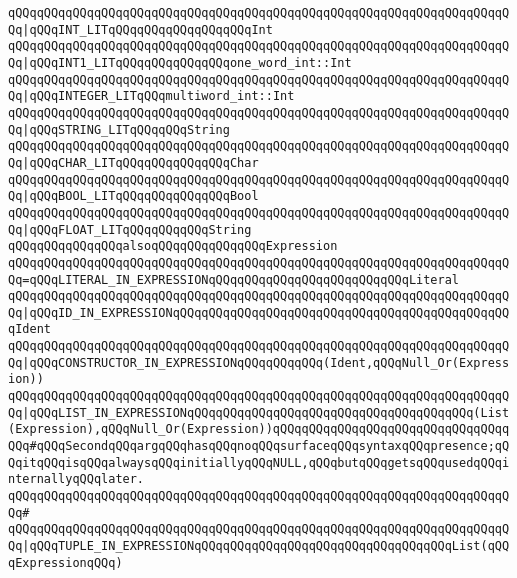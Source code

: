 \verb|qQQqqQQqqQQqqQQqqQQqqQQqqQQqqQQqqQQqqQQqqQQqqQQqqQQqqQQqqQQqqQQqqQQqqQQq|\verb#|qQQqINT_LITqQQqqQQqqQQqqQQqqQQqInt#\newline
\verb|qQQqqQQqqQQqqQQqqQQqqQQqqQQqqQQqqQQqqQQqqQQqqQQqqQQqqQQqqQQqqQQqqQQqqQQq|\verb#|qQQqINT1_LITqQQqqQQqqQQqqQQqone_word_int::Int#\newline
\verb|qQQqqQQqqQQqqQQqqQQqqQQqqQQqqQQqqQQqqQQqqQQqqQQqqQQqqQQqqQQqqQQqqQQqqQQq|\verb#|qQQqINTEGER_LITqQQqmultiword_int::Int#\newline
\verb|qQQqqQQqqQQqqQQqqQQqqQQqqQQqqQQqqQQqqQQqqQQqqQQqqQQqqQQqqQQqqQQqqQQqqQQq|\verb#|qQQqSTRING_LITqQQqqQQqString#\newline
\verb|qQQqqQQqqQQqqQQqqQQqqQQqqQQqqQQqqQQqqQQqqQQqqQQqqQQqqQQqqQQqqQQqqQQqqQQq|\verb#|qQQqCHAR_LITqQQqqQQqqQQqqQQqChar#\newline
\verb|qQQqqQQqqQQqqQQqqQQqqQQqqQQqqQQqqQQqqQQqqQQqqQQqqQQqqQQqqQQqqQQqqQQqqQQq|\verb#|qQQqBOOL_LITqQQqqQQqqQQqqQQqBool#\newline
\verb|qQQqqQQqqQQqqQQqqQQqqQQqqQQqqQQqqQQqqQQqqQQqqQQqqQQqqQQqqQQqqQQqqQQqqQQq|\verb#|qQQqFLOAT_LITqQQqqQQqqQQqString#\newline
\newline
\verb|qQQqqQQqqQQqqQQqalsoqQQqqQQqqQQqqQQqExpression|\newline
\verb|qQQqqQQqqQQqqQQqqQQqqQQqqQQqqQQqqQQqqQQqqQQqqQQqqQQqqQQqqQQqqQQqqQQqqQQq=qQQqLITERAL_IN_EXPRESSIONqQQqqQQqqQQqqQQqqQQqqQQqqQQqLiteral|\newline
\verb|qQQqqQQqqQQqqQQqqQQqqQQqqQQqqQQqqQQqqQQqqQQqqQQqqQQqqQQqqQQqqQQqqQQqqQQq|\verb#|qQQqID_IN_EXPRESSIONqQQqqQQqqQQqqQQqqQQqqQQqqQQqqQQqqQQqqQQqqQQqqQQqIdent#\newline
\verb|qQQqqQQqqQQqqQQqqQQqqQQqqQQqqQQqqQQqqQQqqQQqqQQqqQQqqQQqqQQqqQQqqQQqqQQq|\verb#|qQQqCONSTRUCTOR_IN_EXPRESSIONqQQqqQQqqQQq(Ident,qQQqNull_Or(Expression))#\newline
\verb|qQQqqQQqqQQqqQQqqQQqqQQqqQQqqQQqqQQqqQQqqQQqqQQqqQQqqQQqqQQqqQQqqQQqqQQq|\verb#|qQQqLIST_IN_EXPRESSIONqQQqqQQqqQQqqQQqqQQqqQQqqQQqqQQqqQQqqQQq(List(Expression),qQQqNull_Or(Expression))qQQqqQQqqQQqqQQqqQQqqQQqqQQqqQQqqQQq#\verb|#qQQqSecondqQQqargqQQqhasqQQqnoqQQqsurfaceqQQqsyntaxqQQqpresence;qQQqitqQQqisqQQqalwaysqQQqinitiallyqQQqNULL,qQQqbutqQQqgetsqQQqusedqQQqinternallyqQQqlater.|\newline
\verb|qQQqqQQqqQQqqQQqqQQqqQQqqQQqqQQqqQQqqQQqqQQqqQQqqQQqqQQqqQQqqQQqqQQqqQQq#|\newline
\verb|qQQqqQQqqQQqqQQqqQQqqQQqqQQqqQQqqQQqqQQqqQQqqQQqqQQqqQQqqQQqqQQqqQQqqQQq|\verb#|qQQqTUPLE_IN_EXPRESSIONqQQqqQQqqQQqqQQqqQQqqQQqqQQqqQQqqQQqList(qQQqExpressionqQQq)#\newline
